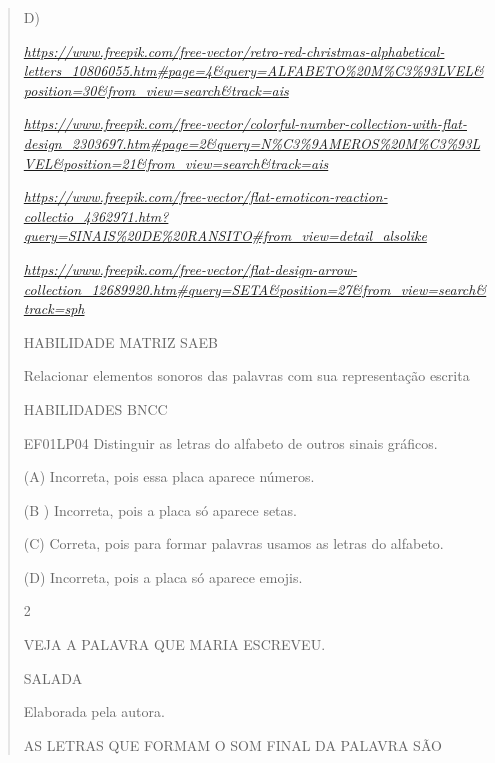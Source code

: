 \begin{escola}
{\begin{verse}
D)

\href{https://www.freepik.com/free-vector/retro-red-christmas-alphabetical-letters_10806055.htm\#page=4\&query=ALFABETO\%20M\%C3\%93LVEL\&position=30\&from_view=search\&track=ais}{\emph{https://www.freepik.com/free-vector/retro-red-christmas-alphabetical-letters\_10806055.htm\#page=4\&query=ALFABETO\%20M\%C3\%93LVEL\&position=30\&from\_view=search\&track=ais}}

\href{https://www.freepik.com/free-vector/colorful-number-collection-with-flat-design_2303697.htm\#page=2\&query=N\%C3\%9AMEROS\%20M\%C3\%93LVEL\&position=21\&from_view=search\&track=ais}{\emph{https://www.freepik.com/free-vector/colorful-number-collection-with-flat-design\_2303697.htm\#page=2\&query=N\%C3\%9AMEROS\%20M\%C3\%93LVEL\&position=21\&from\_view=search\&track=ais}}

\href{https://www.freepik.com/free-vector/flat-emoticon-reaction-collectio_4362971.htm?query=SINAIS\%20DE\%20RANSITO\#from_view=detail_alsolike}{\emph{https://www.freepik.com/free-vector/flat-emoticon-reaction-collectio\_4362971.htm?query=SINAIS\%20DE\%20RANSITO\#from\_view=detail\_alsolike}}

\href{https://www.freepik.com/free-vector/flat-design-arrow-collection_12689920.htm\#query=SETA\&position=27\&from_view=search\&track=sph}{\emph{https://www.freepik.com/free-vector/flat-design-arrow-collection\_12689920.htm\#query=SETA\&position=27\&from\_view=search\&track=sph}}

HABILIDADE MATRIZ SAEB

Relacionar elementos sonoros das palavras com sua representação escrita

HABILIDADES BNCC

EF01LP04 Distinguir as letras do alfabeto de outros sinais gráficos.

(A) Incorreta, pois essa placa aparece números.

(B ) Incorreta, pois a placa só aparece setas.

(C) Correta, pois para formar palavras usamos as letras do alfabeto.

(D) Incorreta, pois a placa só aparece
emojis.\protect\hypertarget{_heading=h.kl8qv6rrx63u}{}{}

\num{2}

VEJA A PALAVRA QUE MARIA ESCREVEU.

SALADA

Elaborada pela autora.

AS LETRAS QUE FORMAM O SOM FINAL DA PALAVRA SÃO


\end{verse}}
\end{escola}
